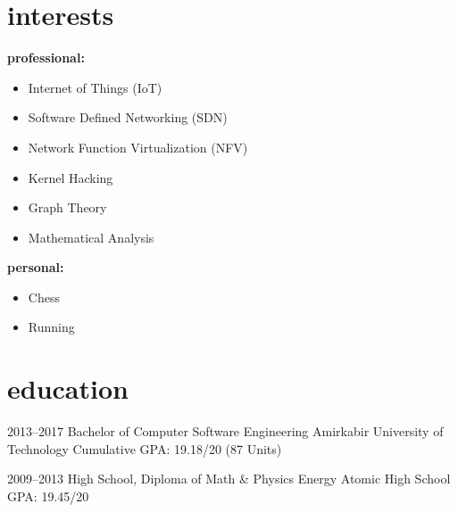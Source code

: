 \documentclass[]{friggeri-cv} %
\begin{document}

\section{interests}
\textbf{professional:}
\begin{itemize}
	\item Internet of Things (IoT)
	\item Software Defined Networking (SDN)
	\item Network Function Virtualization (NFV)
	\item Kernel Hacking
	\item Graph Theory
	\item Mathematical Analysis
\end{itemize}
\textbf{personal:}
\begin{itemize}	
	\item Chess
	\item Running
\end{itemize}



\section{education}

\begin{entrylist}


	\entry
	{2013--2017}
	{Bachelor {\normalfont of Computer Software Engineering}}
	{Amirkabir University of Technology}
	{Cumulative GPA: 19.18/20 (87 Units)}


	\entry
	{2009--2013}
	{High School, {\normalfont Diploma of Math \& Physics}}
	{Energy Atomic High School}
	{GPA: 19.45/20}



\end{entrylist}

\end{document}
